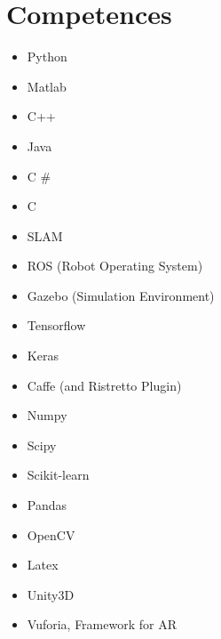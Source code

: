 \documentclass[11pt,a4paper,sans]{moderncv} %
\begin{document}

\section{Competences}

{
\begin{itemize}
\item Python
\item Matlab
\item C++
\item Java
\item C \#
\item C
\end{itemize}
}
{
\begin{itemize}
\item SLAM
\item ROS (Robot Operating System)
\item Gazebo (Simulation Environment)
\end{itemize}
}
{
\begin{itemize}
\item Tensorflow
\item Keras
\item Caffe (and Ristretto Plugin)
\end{itemize}
}
{
\begin{itemize}
\item Numpy
\item Scipy
\item Scikit-learn
\item Pandas
\item OpenCV
\item Latex
\item Unity3D
\item Vuforia, Framework for AR
\end{itemize}
}



\end{document}
